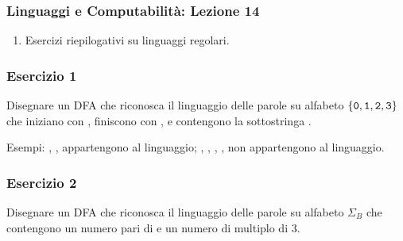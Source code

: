 




\begin{frame}[fragile]
	\frametitle{Linguaggi e Computabilità: Lezione 14}
\begin{enumerate}
\item
Esercizi riepilogativi su linguaggi regolari.
\end{enumerate}
\end{frame}

\begin{frame}
	\frametitle{Esercizio 1}
        Disegnare un DFA che riconosca il linguaggio delle parole su alfabeto $\{ \mathtt{0}, \mathtt{1}, \mathtt{2}, \mathtt{3}\}$ che
        iniziano con \zero, finiscono con \due\zero, e contengono la sottostringa \uno\uno.

	\bigskip
        Esempi: \zero\uno\uno\due\zero, \zero\tre\uno\uno\due\due\zero, \zero\tre\uno\uno\tre\uno\due\zero
        appartengono al linguaggio;
        \uno\uno\due\zero, \zero\uno\zero\due\zero, \zero\uno\uno\zero\due, \zero\uno\uno\zero, \zero\due\zero
        non appartengono al linguaggio.
\end{frame}



\begin{frame}
	\frametitle{Esercizio 2}
	Disegnare un DFA che riconosca il linguaggio delle parole su alfabeto $\Sigma_{B}$
	che contengono un numero pari di \zero e un numero di \uno multiplo di 3.
\end{frame}


